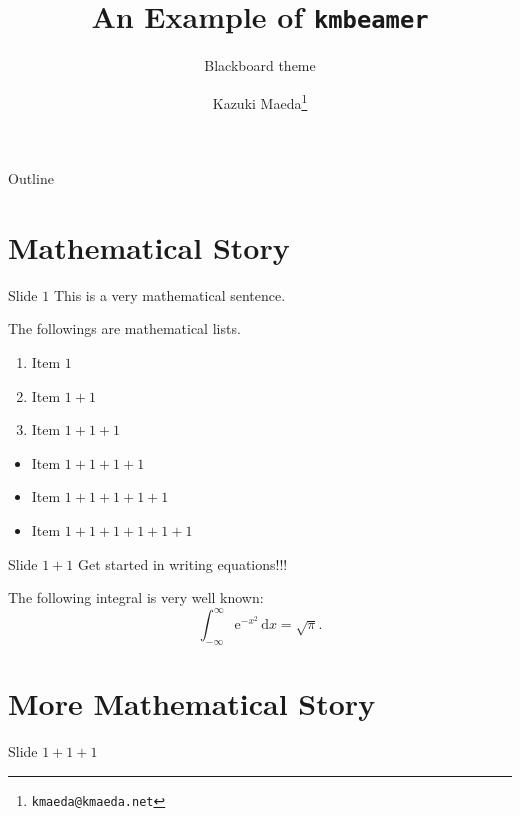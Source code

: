 \documentclass{beamer}
\title{An Example of \texttt{kmbeamer}}
\subtitle{Blackboard theme}
\author{Kazuki Maeda\footnote{\texttt{kmaeda@kmaeda.net}}}
\begin{document}
\begin{frame}
  \maketitle
\end{frame}

\begin{frame}{Outline}
  \tableofcontents
\end{frame}

\section{Mathematical Story}

\begin{frame}{Slide $1$}
  This is a very mathematical sentence.

  \pause

  The followings are mathematical lists.

  \begin{enumerate}
  \item Item $1$\pause
  \item Item $1+1$\pause
  \item Item $1+1+1$
  \end{enumerate}

  \pause

  \begin{itemize}
  \item Item $1+1+1+1$\pause
  \item Item $1+1+1+1+1$\pause
  \item Item $1+1+1+1+1+1$
  \end{itemize}
\end{frame}

\begin{frame}{Slide $1+1$}
  \alert{Get started in writing equations!!!}

  \begin{theorem}
    The following integral is very well known:
    \begin{equation}
      \int_{-\infty}^\infty \mathrm{e}^{-x^2}\,\mathrm{d}x=\sqrt{\pi}.
    \end{equation}

  \end{theorem}
\end{frame}

\section{More Mathematical Story}
\begin{frame}{Slide $1+1+1$}
  \lipsum[1]
\end{frame}
\end{document}
